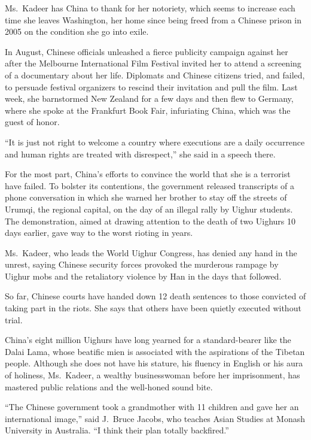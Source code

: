 ﻿\documentclass[12pt]{article}
\begin{document}
Ms.~Kadeer has China to thank for her notoriety, which seems to increase each time she leaves
Washington, her home since being freed from a Chinese prison in 2005 on the condition she go into
exile.

In August, Chinese officials unleashed a fierce publicity campaign against her after the Melbourne
International Film Festival invited her to attend a screening of a documentary about her life.
Diplomats and Chinese citizens tried, and failed, to persuade festival organizers to rescind their
invitation and pull the film. Last week, she barnstormed New Zealand for a few days and then flew to
Germany, where she spoke at the Frankfurt Book Fair, infuriating China, which was the guest of
honor.

``It is just not right to welcome a country where executions are a daily occurrence and human rights
are treated with disrespect,'' she said in a speech there.

For the most part, China's efforts to convince the world that she is a terrorist have failed. To
bolster its contentions, the government released transcripts of a phone conversation in which she
warned her brother to stay off the streets of Urumqi, the regional capital, on the day of an illegal
rally by Uighur students. The demonstration, aimed at drawing attention to the death of two Uighurs
10 days earlier, gave way to the worst rioting in years.

Ms.~Kadeer, who leads the World Uighur Congress, has denied any hand in the unrest, saying Chinese
security forces provoked the murderous rampage by Uighur mobs and the retaliatory violence by Han in
the days that followed.

So far, Chinese courts have handed down 12 death sentences to those convicted of taking part in the
riots. She says that others have been quietly executed without trial.

China's eight million Uighurs have long yearned for a standard-bearer like the Dalai Lama, whose
beatific mien is associated with the aspirations of the Tibetan people. Although she does not have
his stature, his fluency in English or his aura of holiness, Ms.~Kadeer, a wealthy businesswoman
before her imprisonment, has mastered public relations and the well-honed sound bite.

``The Chinese government took a grandmother with 11 children and gave her an international image,''
said J.~Bruce Jacobs, who teaches Asian Studies at Monash University in Australia. ``I think their
plan totally backfired.''
\end{document}
